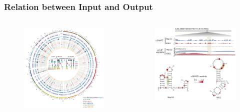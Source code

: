 \documentclass{ctexbeamer}
\begin{document}
\begin{frame}
  \frametitle{Relation between Input and Output}
    \begin{columns}[T]
    \begin{column}{0.5\textwidth}
      \begin{figure}[H]
        \raggedright
        \includegraphics[width=\textwidth]{./figures/relation1.png}
        \label{fig:relation1}
      \end{figure}
    \end{column}
    \begin{column}{0.5\textwidth}
      \begin{figure}[H]
        \raggedleft
        \includegraphics[width=\textwidth]{./figures/snapshot.png}

\end{figure}
\end{column}
\end{columns}
\end{frame}
\end{document}
